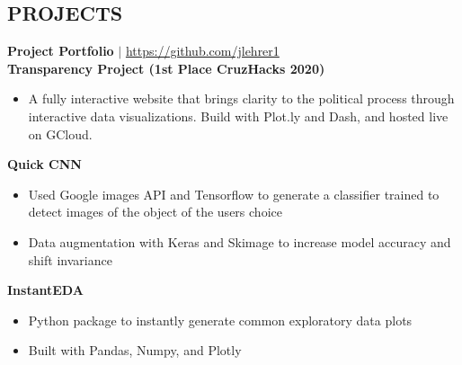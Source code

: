 \documentclass[margin]{res}
\begin{document}
\begin{resume}
\section{PROJECTS}
    \textbf{Project Portfolio} $\mid$ \textcolor{blue}{\href{https://github.com/jlehrer1}{https://github.com/jlehrer1}} \vspace {2mm} \\
    \textbf{Transparency Project (1st Place CruzHacks 2020)}
    \begin{itemize}
        \item A fully interactive website that brings clarity to the political process through interactive data visualizations. Build with Plot.ly and Dash, and hosted live on GCloud.
    \end{itemize}\vspace*{-8pt}
    \textbf{Quick CNN}
    \begin{itemize}
        \item Used Google images API and Tensorflow to generate a classifier  trained to detect images of the object of the users choice
        \item Data augmentation with Keras and Skimage to increase model accuracy and shift invariance
    \end{itemize}\vspace*{-8pt}
    \textbf{InstantEDA}
    \begin{itemize}
        \item Python package to instantly generate common exploratory data plots
        \item Built with Pandas, Numpy, and Plotly 
    \end{itemize}\vspace*{-8pt}


\end{resume}
\end{document}
